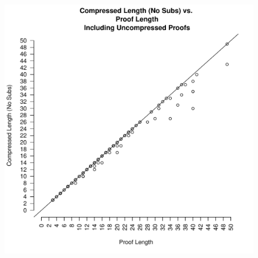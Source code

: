 \begin{figure}
\includegraphics[scale=0.5]{images/compress_length_no_sub_vs_length_all_proofs.pdf}
\end{figure}